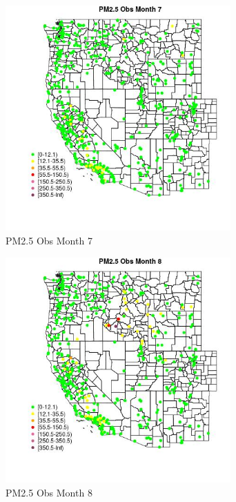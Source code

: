 \begin{figure} 
\centering  
\includegraphics[width=0.77\textwidth]{Code_Outputs/Report_ML_input_PM25_Step4_part_e_de_duplicated_aves_compiled_2019-05-14wNAs_MapObsMo7PM25_Obs.jpg} 
\caption{\label{fig:Report_ML_input_PM25_Step4_part_e_de_duplicated_aves_compiled_2019-05-14wNAsMapObsMo7PM25_Obs}PM2.5 Obs Month 7} 
\end{figure} 
 

\clearpage 

\begin{figure} 
\centering  
\includegraphics[width=0.77\textwidth]{Code_Outputs/Report_ML_input_PM25_Step4_part_e_de_duplicated_aves_compiled_2019-05-14wNAs_MapObsMo8PM25_Obs.jpg} 
\caption{\label{fig:Report_ML_input_PM25_Step4_part_e_de_duplicated_aves_compiled_2019-05-14wNAsMapObsMo8PM25_Obs}PM2.5 Obs Month 8} 
\end{figure} 
 

